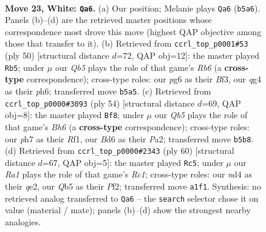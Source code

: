 \documentclass[11pt]{article}
\begin{document}
\clearpage

\begin{figure}[p]\centering
\begin{subfigure}{0.46\textwidth}\centering
\resizebox{\linewidth}{!}{%
\newchessgame
\chessboard[
  setfen={r5k1/p4p1p/3B2p1/1Q6/3nr1q1/P7/5P1P/R6K w - - 1 23},
  showmover=false,
  pgfstyle=straightmove, color=movearrow, markmove={b5-a6}
]}
\caption{}
\end{subfigure}\hfill
\begin{subfigure}{0.46\textwidth}\centering
\resizebox{\linewidth}{!}{%
\newchessgame
\chessboard[
  setfen={5rk1/r2n1pp1/1R2p2p/8/7P/4PB2/5PP1/2R3K1 w - - 1 26},
  showmover=false,
  pgfstyle=straightmove, color=movearrow, markmove={b6-b5}
]}
\caption{}
\end{subfigure}
\\[4pt]
\begin{subfigure}{0.46\textwidth}\centering
\resizebox{\linewidth}{!}{%
\newchessgame
\chessboard[
  setfen={4Q3/kp5p/p6B/2q3p1/3r2n1/8/PP3PP1/5RK1 w - - 2 28},
  showmover=false,
  pgfstyle=straightmove, color=movearrow, markmove={h6-f8}
]}
\caption{}
\end{subfigure}\hfill
\begin{subfigure}{0.46\textwidth}\centering
\resizebox{\linewidth}{!}{%
\newchessgame
\chessboard[
  setfen={4r1k1/5p2/p5p1/7p/1P1Q4/7P/4qPPK/2R5 w - - 2 31},
  showmover=false,
  pgfstyle=straightmove, color=movearrow, markmove={c1-c5}
]}
\caption{}
\end{subfigure}
\caption{\textbf{Move 23, White: \texttt{Qa6}.} (a) Our position; Melanie plays \texttt{Qa6} (\texttt{b5a6}). Panels (b)--(d) are the retrieved master positions whose correspondence most drove this move (highest QAP objective among those that transfer to it). (b) Retrieved from \texttt{ccrl\_top\_p0001\#53} (ply 50) [structural distance $d$=72, QAP obj=12]: the master played \texttt{Rb5}; under $\mu$ our \emph{Qb5} plays the role of that game's \emph{Rb6} (a \textbf{cross-type} correspondence); cross-type roles: our \emph{p}g6 as their \emph{B}f3, our \emph{q}g4 as their \emph{p}h6; transferred move \texttt{b5a5}. (c) Retrieved from \texttt{ccrl\_top\_p0000\#3093} (ply 54) [structural distance $d$=69, QAP obj=8]: the master played \texttt{Bf8}; under $\mu$ our \emph{Qb5} plays the role of that game's \emph{Bh6} (a \textbf{cross-type} correspondence); cross-type roles: our \emph{p}h7 as their \emph{R}f1, our \emph{B}d6 as their \emph{P}a2; transferred move \texttt{b5b8}. (d) Retrieved from \texttt{ccrl\_top\_p0000\#2343} (ply 60) [structural distance $d$=67, QAP obj=5]: the master played \texttt{Rc5}; under $\mu$ our \emph{Ra1} plays the role of that game's \emph{Rc1}; cross-type roles: our \emph{n}d4 as their \emph{q}e2, our \emph{Q}b5 as their \emph{P}f2; transferred move \texttt{a1f1}. Synthesis: no retrieved analog transferred to \texttt{Qa6} -- the \texttt{search} selector chose it on value (material / mate); panels (b)--(d) show the strongest nearby analogies.}
\label{fig:thought-m44}
\end{figure}
\end{document}
